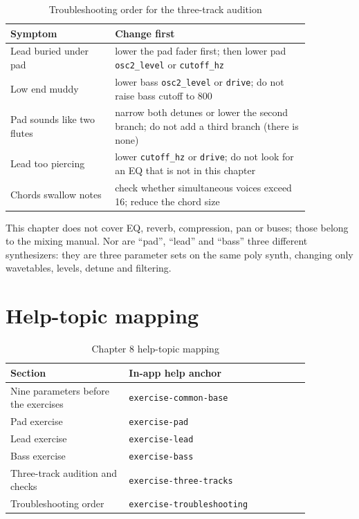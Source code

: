 \begin{table}[htbp]
\centering
\small
\begin{tabular}{@{}p{0.30\linewidth}p{0.56\linewidth}@{}}
\hline
Symptom & Change first \\
\hline
Lead buried under pad & lower the pad fader first; then lower pad \texttt{osc2\_level} or \texttt{cutoff\_hz} \\
Low end muddy & lower bass \texttt{osc2\_level} or \texttt{drive}; do not raise bass cutoff to 800 \\
Pad sounds like two flutes & narrow both detunes or lower the second branch; do not add a third branch (there is none) \\
Lead too piercing & lower \texttt{cutoff\_hz} or \texttt{drive}; do not look for an EQ that is not in this chapter \\
Chords swallow notes & check whether simultaneous voices exceed 16; reduce the chord size \\
\hline
\end{tabular}
\caption{Troubleshooting order for the three-track audition}
\label{tab:exercise-troubleshooting}
\end{table}

This chapter does not cover EQ, reverb, compression, pan or buses; those belong to the mixing manual. Nor are ``pad'', ``lead'' and ``bass'' three different synthesizers: they are three parameter sets on the same poly synth, changing only wavetables, levels, detune and filtering.

\section{Help-topic mapping}

\begin{table}[htbp]
\centering
\small
\begin{tabular}{@{}p{0.34\linewidth}p{0.52\linewidth}@{}}
\hline
Section & In-app help anchor \\
\hline
Nine parameters before the exercises & \texttt{exercise-common-base} \\
Pad exercise & \texttt{exercise-pad} \\
Lead exercise & \texttt{exercise-lead} \\
Bass exercise & \texttt{exercise-bass} \\
Three-track audition and checks & \texttt{exercise-three-tracks} \\
Troubleshooting order & \texttt{exercise-troubleshooting} \\
\hline
\end{tabular}
\caption{Chapter 8 help-topic mapping}
\label{tab:exercise-help-map}
\end{table}


